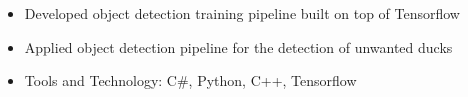 \begin{itemize}
    \setlength\itemsep{0pt}
    \setlength{\parskip}{0pt}
    \item Developed object detection training pipeline built on top of Tensorflow
    \item Applied object detection pipeline for the detection of unwanted ducks
    \item Tools and Technology: C\#, Python, C++, Tensorflow
\end{itemize}
